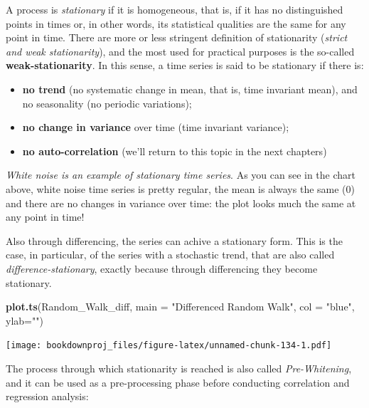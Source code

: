 \documentclass[
]{article}
\newenvironment{Shaded}{\begin{snugshade}}{\end{snugshade}}
\newcommand{\DataTypeTok}[1]{\textcolor[rgb]{0.13,0.29,0.53}{#1}}
\newcommand{\KeywordTok}[1]{\textcolor[rgb]{0.13,0.29,0.53}{\textbf{#1}}}
\newcommand{\NormalTok}[1]{#1}
\newcommand{\StringTok}[1]{\textcolor[rgb]{0.31,0.60,0.02}{#1}}
\providecommand{\tightlist}{%
  \setlength{\itemsep}{0pt}\setlength{\parskip}{0pt}}
\begin{document}
A process is \emph{stationary} if it is homogeneous, that is, if it has no distinguished points in times or, in other words, its statistical qualities are the same for any point in time. There are more or less stringent definition of stationarity (\emph{strict and weak stationarity}), and the most used for practical purposes is the so-called \textbf{weak-stationarity}. In this sense, a time series is said to be stationary if there is:

\begin{itemize}
\tightlist
\item
  \textbf{no trend} (no systematic change in mean, that is, time invariant mean), and no seasonality (no periodic variations);
\item
  \textbf{no change in variance} over time (time invariant variance);
\item
  \textbf{no auto-correlation} (we'll return to this topic in the next chapters)
\end{itemize}

\emph{White noise is an example of stationary time series}. As you can see in the chart above, white noise time series is pretty regular, the mean is always the same (0) and there are no changes in variance over time: the plot looks much the same at any point in time!

Also through differencing, the series can achive a stationary form. This is the case, in particular, of the series with a stochastic trend, that are also called \emph{difference-stationary}, exactly because through differencing they become stationary.

\begin{Shaded}
\begin{Highlighting}[]
\KeywordTok{plot.ts}\NormalTok{(Random_Walk_diff, }
        \DataTypeTok{main =} \StringTok{"Differenced Random Walk"}\NormalTok{, }
        \DataTypeTok{col =} \StringTok{"blue"}\NormalTok{, }\DataTypeTok{ylab=}\StringTok{""}\NormalTok{)}
\end{Highlighting}
\end{Shaded}

\texttt{[image: bookdownproj\_files/figure-latex/unnamed-chunk-134-1.pdf]}

The process through which stationarity is reached is also called \emph{Pre-Whitening}, and it can be used as a pre-processing phase before conducting correlation and regression analysis:
\end{document}
